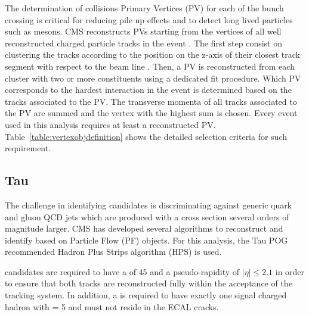 The determination of collisions Primary Vertices (PV) for each of the bunch crossing is critical for reducing pile up effects and to detect long lived particles such as mesons. CMS reconstructs PVs starting from the vertices of all well reconstructed charged particle tracks in the event \cite{CMS-PAS-TRK-10-005}. The first step consist on clustering the tracks according to the position on the z-axis of their closest track segment with respect to the beam line \cite{CMS-IN-2011-014}. Then, a PV is reconstructed from each cluster with two or more constituents using a dedicated fit procedure. Which PV corresponds to the hardest interaction in the event is determined based on the tracks associated to the PV. The transverse momenta of all tracks associated to the PV are summed and the vertex with the highest sum is chosen. Every event used in this analysis requires at least a reconstructed PV. Table~\ref{table:vertexobjdefinition} shows the detailed selection criteria for such requirement.

\subsection{Tau}
\label{subsec::objsel_tau}

	
	
	

The challenge in identifying \hadtau candidates is discriminating against generic quark and gluon QCD jets which are produced with a cross section several orders of magnitude larger. CMS has developed several algorithms to reconstruct and identify \hadtau based on Particle Flow (PF) objects. For this analysis, the Tau POG recommended Hadron Plus Strips algorithm (HPS) is used. 

\hadtau candidates are required to have a \pt of 45 \gev and a pseudo-rapidity of $|\eta| \le 2.1$ in order to ensure that both tracks are reconstructed fully within the acceptance of the tracking system. In addition, a \hadtau is required to have exactly one signal charged hadron with \pt = 5 \gev and must not reside in the ECAL cracks.

